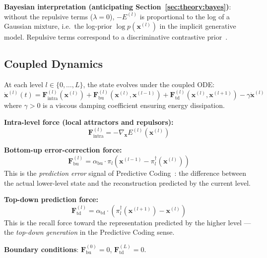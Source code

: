 \documentclass[11pt,a4paper]{article}
\begin{document}
\textbf{Bayesian interpretation (anticipating Section~\ref{sec:theory:bayes})}: without the
repulsive terms ($\lambda=0$), $-E^{(l)}$ is proportional to the log of a Gaussian mixture,
i.e.\ the log-prior $\log p(\mathbf{x}^{(l)})$ in the implicit generative model.  Repulsive
terms correspond to a discriminative contrastive prior~\cite{larochelle2008}.

\subsection{Coupled Dynamics}

At each level $l \in \{0, \ldots, L\}$, the state evolves under the coupled ODE:
\begin{equation}
  \dot{\mathbf{x}}^{(l)}(t) =
  \mathbf{F}^{(l)}_{\mathrm{intra}}(\mathbf{x}^{(l)})
  + \mathbf{F}^{(l)}_{\mathrm{bu}}(\mathbf{x}^{(l)}, \mathbf{x}^{(l-1)})
  + \mathbf{F}^{(l)}_{\mathrm{td}}(\mathbf{x}^{(l)}, \mathbf{x}^{(l+1)})
  - \gamma \dot{\mathbf{x}}^{(l)}
\label{eq:dynamics}
\end{equation}
where $\gamma > 0$ is a viscous damping coefficient ensuring energy dissipation.

\medskip
\textbf{Intra-level force (local attractors and repulsors):}
\begin{equation}
  \mathbf{F}^{(l)}_{\mathrm{intra}} = -\nabla_{\mathbf{x}} E^{(l)}(\mathbf{x}^{(l)})
\end{equation}

\textbf{Bottom-up error-correction force:}
\begin{equation}
  \mathbf{F}^{(l)}_{\mathrm{bu}} =
  \alpha_{\mathrm{bu}} \cdot \pi_l\!\left(
    \mathbf{x}^{(l-1)} - \pi_l^\dagger(\mathbf{x}^{(l)})
  \right)
\end{equation}
This is the \emph{prediction error} signal of Predictive Coding~\cite{rao1999predictive}: the
difference between the actual lower-level state and the reconstruction predicted by the current
level.

\textbf{Top-down prediction force:}
\begin{equation}
  \mathbf{F}^{(l)}_{\mathrm{td}} =
  \alpha_{\mathrm{td}} \cdot \left(
    \pi_l^\dagger\!\left(\mathbf{x}^{(l+1)}\right) - \mathbf{x}^{(l)}
  \right)
\end{equation}
This is the recall force toward the representation predicted by the higher level --- the
\emph{top-down generation} in the Predictive Coding sense.

\textbf{Boundary conditions}: $\mathbf{F}^{(0)}_{\mathrm{bu}} = 0$,
$\mathbf{F}^{(L)}_{\mathrm{td}} = 0$.
\end{document}
